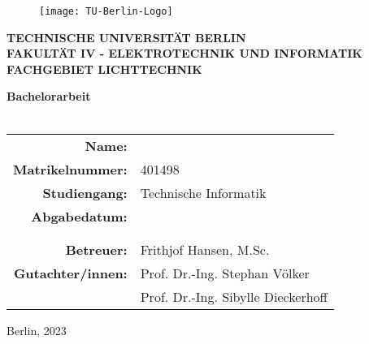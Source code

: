 \thispagestyle{empty} %

\begin{center}
	\begin{figure}
		\begin{center}
			\texttt{[image: TU-Berlin-Logo]}
		\end{center}
	\end{figure}
	\small
	\textbf{TECHNISCHE  UNIVERSITÄT BERLIN\\
		FAKULTÄT IV - ELEKTROTECHNIK UND INFORMATIK\\
		FACHGEBIET LICHTTECHNIK}
	
	\vfill
	\normalsize
	\textbf{Bachelorarbeit} \\ 
	\Large
	\textbf{\ttitle} \\ 
	

	\vfill
	\normalsize
	\begin{tabular}{ >{\bfseries}r l}
		Name: 				& \authorname\\
		Matrikelnummer:		& 401498\\
		Studiengang:		& Technische Informatik\\
		Abgabedatum: 		& \submissionDate\\
							& \\
		\hline
							& \\
		Betreuer: 			& Frithjof Hansen, M.Sc.\\ 
		Gutachter/innen:  	& Prof. Dr.-Ing. Stephan Völker\\  
	 						& Prof. Dr.-Ing. Sibylle Dieckerhoff\\
	\end{tabular}


	\vfill
	\small
	Berlin, 2023\\
	
\end{center}
\newpage
